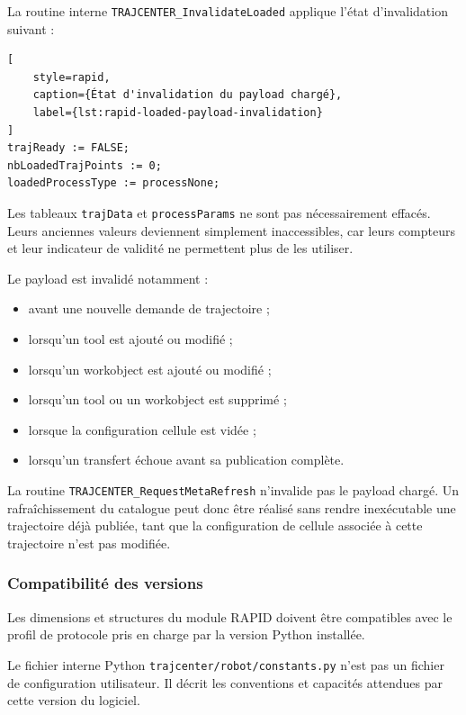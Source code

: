 \documentclass{rapportENSAM}
\begin{document}
La routine interne \texttt{TRAJCENTER\_InvalidateLoaded} applique l'état
d'invalidation suivant :

\begin{lstlisting}[
    style=rapid,
    caption={État d'invalidation du payload chargé},
    label={lst:rapid-loaded-payload-invalidation}
]
trajReady := FALSE;
nbLoadedTrajPoints := 0;
loadedProcessType := processNone;
\end{lstlisting}

Les tableaux \texttt{trajData} et \texttt{processParams} ne sont pas
nécessairement effacés. Leurs anciennes valeurs deviennent simplement
inaccessibles, car leurs compteurs et leur indicateur de validité ne permettent
plus de les utiliser.

Le payload est invalidé notamment :

\begin{itemize}
    \item avant une nouvelle demande de trajectoire ;
    \item lorsqu'un tool est ajouté ou modifié ;
    \item lorsqu'un workobject est ajouté ou modifié ;
    \item lorsqu'un tool ou un workobject est supprimé ;
    \item lorsque la configuration cellule est vidée ;
    \item lorsqu'un transfert échoue avant sa publication complète.
\end{itemize}

La routine \texttt{TRAJCENTER\_RequestMetaRefresh} n'invalide pas le payload
chargé. Un rafraîchissement du catalogue peut donc être réalisé sans rendre
inexécutable une trajectoire déjà publiée, tant que la configuration de cellule
associée à cette trajectoire n'est pas modifiée.


\subsubsection{Compatibilité des versions}
\label{subsubsec:rapid-version-compatibility}

Les dimensions et structures du module RAPID doivent être compatibles avec le
profil de protocole pris en charge par la version Python installée.

Le fichier interne Python
\texttt{trajcenter/robot/constants.py} n'est pas un fichier de configuration
utilisateur. Il décrit les conventions et capacités attendues par cette version
du logiciel.
\end{document}
